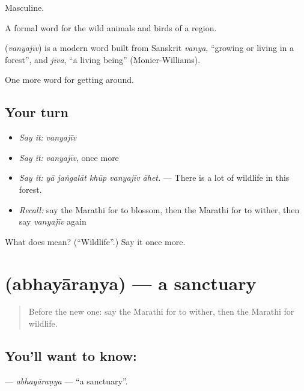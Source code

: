 Masculine.

A formal word for the wild animals and birds of a region.

\begin{cousinweb}
\textbf{} (\emph{vanyajīv}) is a modern word built from Sanskrit \emph{vanya}, \textquotedblleft{}growing or living in a forest\textquotedblright{}, and \emph{jīva}, \textquotedblleft{}a living being\textquotedblright{} (Monier-Williams).
\end{cousinweb}

\begin{grammarlens}[title={What you've built}]
One more word for getting around.
\end{grammarlens}

\subsection*{Your turn}
\begin{itemize}
\raggedright
  \item \emph{Say it:} \emph{vanyajīv}
  \item \emph{Say it:} \emph{vanyajīv}, once more
  \item \emph{Say it:} \emph{yā jaṅgalāt khūp vanyajīv āhet.} — There is a lot of wildlife in this forest.
  \item \emph{Recall:} say the Marathi for to blossom, then the Marathi for to wither, then say \emph{vanyajīv} again
\end{itemize}

\begin{tcolorbox}[breakable,colback=teal!4,colframe=teal!35!black,title={Before you move on}]
What does  mean? (\textquotedblleft{}Wildlife\textquotedblright{}.) Say it once more.
\end{tcolorbox}
\section[\texorpdfstring{\mr{अभयारण्य} (abhayāraṇya)}{अभयारण्य (abhayāraṇya)}]{ (abhayāraṇya) — a sanctuary}

\label{lesson:MR-C446-abhayaranya}



\begin{quote}
Before the new one: say the Marathi for to wither, then the Marathi for wildlife.
\end{quote}

\subsection*{You'll want to know: }
\textbf{} — \emph{abhayāraṇya} — \textquotedblleft{}a sanctuary\textquotedblright{}.

